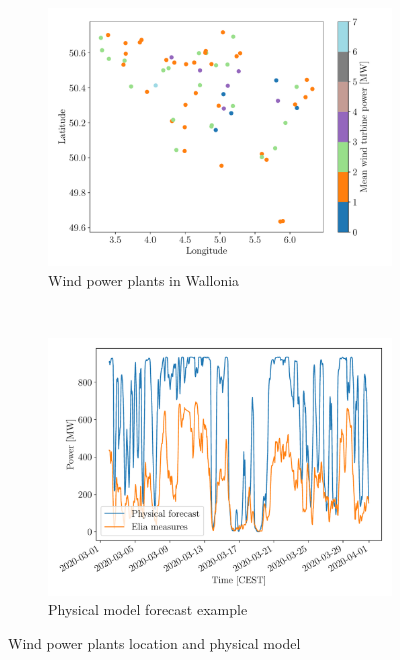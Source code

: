 \documentclass[a4paper, 12pt]{article}
\begin{document}
	\begin{figure}[H]
		\centering
		\begin{subfigure}[t]{0.48\textwidth}
			\centering
			\includegraphics[width=\textwidth]{resources/pdf/wind_farms.pdf}
			\caption{Wind power plants in Wallonia}
			\label{fig:wind_farms}
		\end{subfigure}
		~
		\begin{subfigure}[t]{0.48\textwidth}
			\centering
			\includegraphics[width=\textwidth]{resources/pdf/wind_phys.pdf}
			\caption{Physical model forecast example}
			\label{fig:wind_phys}
		\end{subfigure}
		\caption{Wind power plants location and physical model}
	\end{figure}
	
\end{document}
